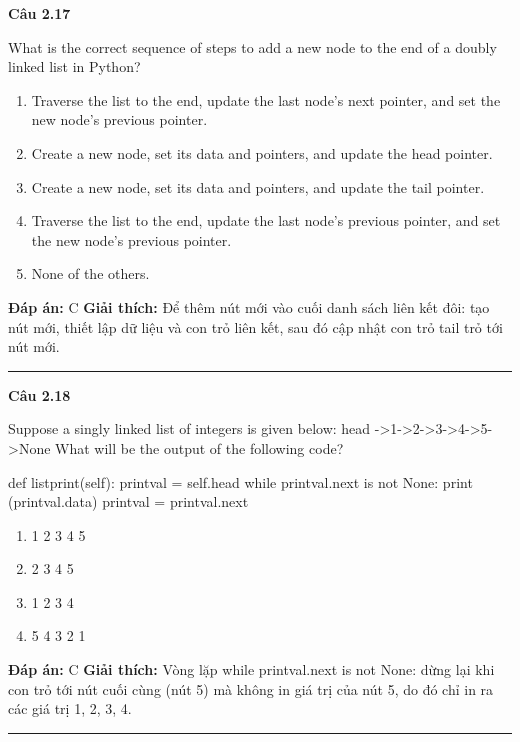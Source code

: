 \documentclass[11pt,a4paper]{article}
\newenvironment{question}[1]{%
  \par\vspace{1em}\noindent\textbf{\large Câu #1}\par\vspace{0.4em}
}{%
  \par\vspace{1em}\hrule\vspace{0.6em}
}
\newenvironment{choices}{%
  \begin{enumerate}[label=\textbf{\Alph*.},leftmargin=2.2em,itemsep=2pt,topsep=3pt]
}{%
  \end{enumerate}
}
\newcommand{\choice}{\item}
\newenvironment{codebox}{%
  \begin{tcolorbox}[colback=gray!8!white,colframe=gray!50!black,arc=1.5mm,boxrule=0.6pt,left=3mm,right=3mm,top=2.5mm,bottom=2.5mm]
  \ttfamily\small
}{%
  \end{tcolorbox}
}
\begin{document}
\begin{question}{2.17}
What is the correct sequence of steps to add a new node to the end of a doubly linked list in Python?
\begin{choices}
\choice Traverse the list to the end, update the last node's next pointer, and set the new node's previous pointer.
\choice Create a new node, set its data and pointers, and update the head pointer.
\choice Create a new node, set its data and pointers, and update the tail pointer.
\choice Traverse the list to the end, update the last node's previous pointer, and set the new node's previous pointer.
\choice None of the others.
\end{choices}
\textbf{Đáp án:} C
\textbf{Giải thích:} Để thêm nút mới vào cuối danh sách liên kết đôi: tạo nút mới, thiết lập dữ liệu và con trỏ liên kết, sau đó cập nhật con trỏ tail trỏ tới nút mới.
\end{question}

\begin{question}{2.18}
Suppose a singly linked list of integers is given below: head ->1->2->3->4->5->None What will be the output of the following code?
\begin{codebox}
def listprint(self):
    printval = self.head
    while printval.next is not None:
        print (printval.data)
        printval = printval.next
\end{codebox}
\begin{choices}
\choice 1 2 3 4 5
\choice 2 3 4 5
\choice 1 2 3 4
\choice 5 4 3 2 1
\end{choices}
\textbf{Đáp án:} C
\textbf{Giải thích:} Vòng lặp while printval.next is not None: dừng lại khi con trỏ tới nút cuối cùng (nút 5) mà không in giá trị của nút 5, do đó chỉ in ra các giá trị 1, 2, 3, 4.
\end{question}
\end{document}
